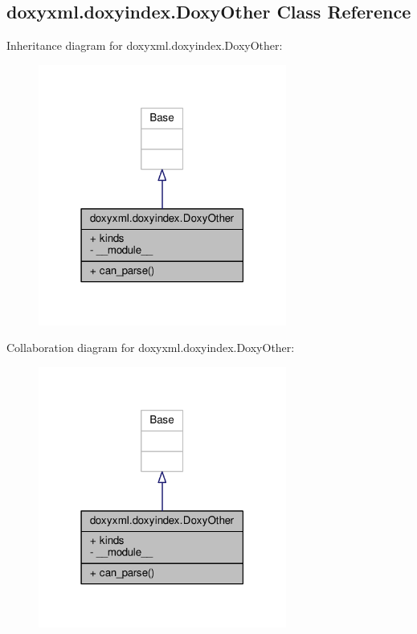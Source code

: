 \subsection{doxyxml.\+doxyindex.\+Doxy\+Other Class Reference}
\label{classdoxyxml_1_1doxyindex_1_1DoxyOther}


Inheritance diagram for doxyxml.\+doxyindex.\+Doxy\+Other\+:
\nopagebreak
\begin{figure}[H]
\begin{center}
\leavevmode
\includegraphics[width=231pt]{da/d3d/classdoxyxml_1_1doxyindex_1_1DoxyOther__inherit__graph}
\end{center}
\end{figure}


Collaboration diagram for doxyxml.\+doxyindex.\+Doxy\+Other\+:
\nopagebreak
\begin{figure}[H]
\begin{center}
\leavevmode
\includegraphics[width=231pt]{d8/d57/classdoxyxml_1_1doxyindex_1_1DoxyOther__coll__graph}
\end{center}
\end{figure}
